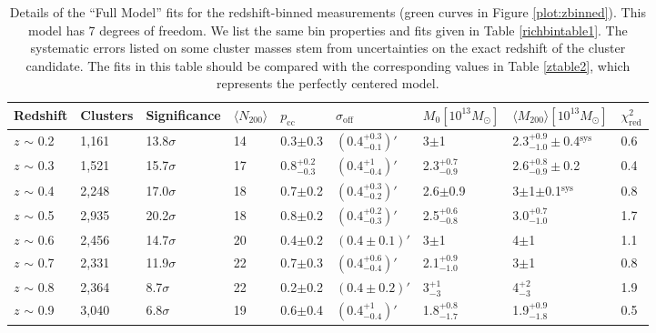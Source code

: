 \begin{landscape}
\begin{table}
\centering
    \caption[Shear Results for Redshift-Binned Clusters (Full Model)]{Details of the ``Full Model'' fits for the redshift-binned measurements (green curves in Figure \ref{plot:zbinned}). This model has 7 degrees of freedom. We list the same bin properties and fits given in Table \ref{richbintable1}. The systematic errors listed on some cluster masses stem from uncertainties on the exact redshift of the cluster candidate. The fits in this table should be compared with the corresponding values in Table \ref{ztable2}, which represents the perfectly centered model.}
    \begin{tabular}{lllllllll}
      \hline
      Redshift & Clusters & Significance & $\langle N_{200} \rangle$ & $p_{\mathrm{cc}}$ & $\sigma_{\mathrm{off}}$ & $M_0 \left[ 10^{13} M_{\odot}\right]$ & $\langle M_{200} \rangle \left[ 10^{13} M_{\odot}\right]$ & $\chi^2_{\mathrm{red}}$ \\ \hline
      $z$ $\sim$ 0.2 & 1,161 & 13.8$\sigma$ & 14 & 0.3$\pm$0.3 & $(0.4^{+0.3}_{-0.1})'$ & 3$\pm$1 & 2.3$^{+0.9}_{-1.0}\pm$0.4$^{\mathrm{sys}}$ & 0.6 \\
      $z$ $\sim$ 0.3 & 1,521 & 15.7$\sigma$ & 17 & 0.8$^{+0.2}_{-0.3}$ & $(0.4^{+1}_{-0.4})'$ & 2.3$^{+0.7}_{-0.9}$ & 2.6$^{+0.8}_{-0.9}\pm$0.2 & 0.4 \\
      $z$ $\sim$ 0.4 & 2,248 & 17.0$\sigma$ & 18 & 0.7$\pm$0.2 & $(0.4^{+0.3}_{-0.2})'$ & 2.6$\pm$0.9 & 3$\pm$1$\pm$0.1$^{\mathrm{sys}}$ & 0.8 \\
      $z$ $\sim$ 0.5 & 2,935 & 20.2$\sigma$ & 18 & 0.8$\pm$0.2 & $(0.4^{+0.2}_{-0.3})'$ & 2.5$^{+0.6}_{-0.8}$ & 3.0$^{+0.7}_{-1.0}$ & 1.7 \\
      $z$ $\sim$ 0.6 & 2,456 & 14.7$\sigma$ & 20 & 0.4$\pm$0.2 & $(0.4\pm0.1)'$ & 3$\pm$1 & 4$\pm$1 & 1.1 \\
      $z$ $\sim$ 0.7 & 2,331 & 11.9$\sigma$ & 22 & 0.7$\pm$0.3 & $(0.4^{+0.6}_{-0.4})'$ & 2.1$^{+0.9}_{-1.0}$ & 3$\pm$1 & 0.8 \\
      $z$ $\sim$ 0.8 & 2,364 & 8.7$\sigma$ & 22 & 0.2$\pm$0.2 & $(0.4\pm0.2)'$ & 3$^{+1}_{-3}$ & 4$^{+2}_{-3}$ & 1.9 \\ 
      $z$ $\sim$ 0.9 & 3,040 & 6.8$\sigma$ & 19 & 0.6$\pm$0.4 & $(0.4^{+1}_{-0.4})'$ & 1.8$^{+0.8}_{-1.7}$ & 1.9$^{+0.9}_{-1.8}$ & 0.5 \\
      \hline
    \end{tabular}
    \label{ztable1}
\end{table}


\end{landscape}
